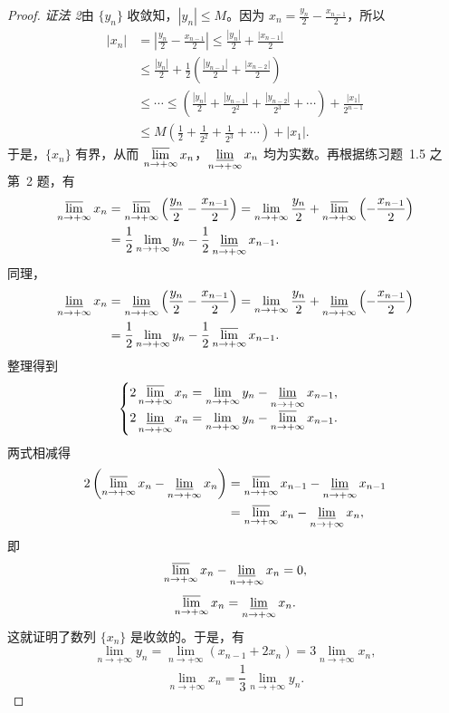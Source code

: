 \begin{proof}
\textit{证法 2}\quad 由 $\{y_n\}$ 收敛知，$|y_n| \leqslant M$。因为 $x_n = \frac{y_n}{2} - \frac{x_{n-1}}{2}$，所以
\begin{align*}
|x_n| &= \left|\frac{y_n}{2} - \frac{x_{n-1}}{2}\right| \leqslant \frac{|y_n|}{2} + \frac{|x_{n-1}|}{2}\\
&\leqslant \frac{|y_n|}{2} + \frac{1}{2}\left(\frac{|y_{n-1}|}{2} + \frac{|x_{n-2}|}{2}\right)\\
&\leqslant \cdots \leqslant \left(\frac{|y_n|}{2} + \frac{|y_{n-1}|}{2^2} + \frac{|y_{n-2}|}{2^3} + \cdots\right) + \frac{|x_1|}{2^{n-1}}\\
&\leqslant M\left(\frac{1}{2} + \frac{1}{2^2} + \frac{1}{2^3} + \cdots\right) + |x_1|.
\end{align*}
于是，$\{x_n\}$ 有界，从而 $\varlimsup\limits_{n\to+\infty} x_n$，$\varliminf\limits_{n\to+\infty} x_n$ 均为实数。再根据练习题~1.5 之第~2 题，有
\begin{align*}
\varlimsup_{n\to+\infty} x_n &= \varlimsup_{n\to+\infty} \left(\frac{y_n}{2} - \frac{x_{n-1}}{2}\right) = \lim_{n\to+\infty} \frac{y_n}{2} + \varlimsup_{n\to+\infty} \left(-\frac{x_{n-1}}{2}\right)\\
&= \frac{1}{2}\lim_{n\to+\infty} y_n - \frac{1}{2}\varliminf_{n\to+\infty} x_{n-1}.
\end{align*}
同理，
\begin{align*}
\varliminf_{n\to+\infty} x_n &= \varliminf_{n\to+\infty} \left(\frac{y_n}{2} - \frac{x_{n-1}}{2}\right) = \lim_{n\to+\infty} \frac{y_n}{2} + \varliminf_{n\to+\infty} \left(-\frac{x_{n-1}}{2}\right)\\
&= \frac{1}{2}\lim_{n\to+\infty} y_n - \frac{1}{2}\varlimsup_{n\to+\infty} x_{n-1}.
\end{align*}
整理得到
\[
\begin{cases}
2\varlimsup\limits_{n\to+\infty} x_n = \lim\limits_{n\to+\infty} y_n - \varliminf\limits_{n\to+\infty} x_{n-1},\\[2mm]
2\varliminf\limits_{n\to+\infty} x_n = \lim\limits_{n\to+\infty} y_n - \varlimsup\limits_{n\to+\infty} x_{n-1}.
\end{cases}
\]
两式相减得
\begin{align*}
2\left(\varlimsup_{n\to+\infty} x_n - \varliminf_{n\to+\infty} x_n\right) &= \varlimsup_{n\to+\infty} x_{n-1} - \varliminf_{n\to+\infty} x_{n-1}\\
&= \varlimsup_{n\to+\infty} x_n - \varliminf_{n\to+\infty} x_n,
\end{align*}
即
\[
\varlimsup_{n\to+\infty} x_n - \varliminf_{n\to+\infty} x_n = 0,
\]
\[
\varlimsup_{n\to+\infty} x_n = \varliminf_{n\to+\infty} x_n.
\]
这就证明了数列 $\{x_n\}$ 是收敛的。于是，有
\[
\lim_{n\to+\infty} y_n = \lim_{n\to+\infty} (x_{n-1} + 2x_n) = 3\lim_{n\to+\infty} x_n,
\]
\[
\lim_{n\to+\infty} x_n = \frac{1}{3}\lim_{n\to+\infty} y_n.
\]


\end{proof}
